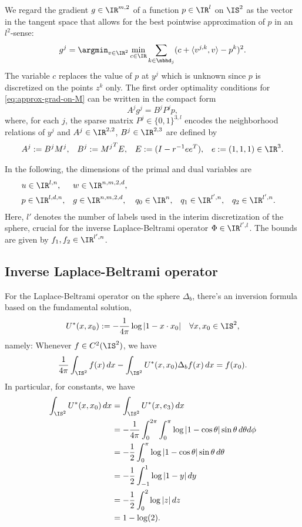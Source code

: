 We regard the gradient $g \in \IR^{m,2}$ of a function $p \in \IR^{l}$ on $\IS^2$
as the vector in the tangent space that allows for the best pointwise
approximation of $p$ in an $l^2$-sense:
\begin{equation}\label{eq:approx-grad-on-M}
    g^j = \argmin_{v \in \IR^2} \min_{c \in \IR} \sum_{k \in \nbhd_j} (
        c + \langle v^{j,k}, v \rangle - p^k
    )^2.
\end{equation}
The variable $c$ replaces the value of $p$ at $y^j$ which is unknown since $p$
is discretized on the points $z^k$ only.
The first order optimality conditions for \eqref{eq:approx-grad-on-M} can be
written in the compact form
\begin{equation}
    A^j g^j = B^j P^j p,
\end{equation}
where, for each $j$, the sparse matrix $P^j \in \{0,1\}^{3,l}$ encodes the neighborhood
relations of $y^j$ and $A^j \in \IR^{2,2}$, $B^j \in \IR^{2,3}$ are defined by
\begin{align}
    A^j := B^j M^j, &&
    B^j := {M^j}^T E, &&
    E := (I - r^{-1} ee^T), &&
    e := (1, 1, 1) \in \IR^3.
\end{align}

In the following, the dimensions of the primal and dual variables are 
\begin{align*}
    & u \in \IR^{l,n}, && w \in \IR^{n,m,2,d}, \\
    & p \in \IR^{l,d,n}, && g \in \IR^{n,m,2,d}, && q_0 \in \IR^{n},
        && q_1 \in \IR^{l',n}, && q_2 \in \IR^{l',n}.
\end{align*}
Here, $l'$ denotes the number of labels used in the interim discretization of
the sphere, crucial for the inverse Laplace-Beltrami operator
$\Phi \in \IR^{l',l}$.
The bounds are given by $f_1, f_2 \in \IR^{l',n}$.

\subsection{Inverse Laplace-Beltrami operator}

For the Laplace-Beltrami operator on the sphere $\Delta_b$, there's an inversion
formula based on the fundamental solution,
\[
    U^*(x,x_0) := -\frac{1}{4\pi}\log|1 - x \cdot x_0|
    \quad \forall x, x_0 \in \IS^2,
\]
namely:
Whenever $f \in C^2(\IS^2)$, we have
\[
    \frac{1}{4\pi}\int_{\IS^2} f(x) \,dx
    - \int_{\IS^2} U^*(x,x_0) \Delta_b f(x) \,dx = f(x_0).
\]
In particular, for constants, we have
\begin{align*}
    \int_{\IS^2} U^*(x,x_0) \,dx
    &= \int_{\IS^2} U^*(x,e_3) \,dx \\
    &= -\frac{1}{4\pi} \int_0^{2\pi}\int_0^\pi
            \log|1 - \cos\theta| \sin\theta
        \,d\theta d\phi \\
    &= -\frac{1}{2} \int_0^\pi
            \log|1 - \cos\theta| \sin\theta
        \,d\theta \\
    &= -\frac{1}{2} \int_{-1}^1 \log|1 - y| \,dy \\
    &= -\frac{1}{2} \int_{0}^2 \log|z| \,dz \\
    &= 1 - \log(2).
\end{align*}

